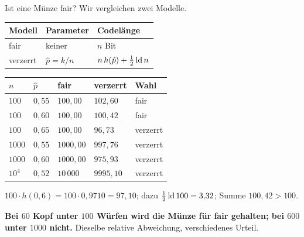 \begin{merksatz}
Ist eine Münze fair? Wir vergleichen zwei Modelle.

\begin{center}
{\small
\renewcommand{\arraystretch}{1.5}
\begin{tabular}{@{}P{2.2cm}P{2.4cm}P{3.4cm}@{}}
\toprule
\textbf{Modell} & \textbf{Parameter} & \textbf{Codelänge}\\
\midrule
fair & keiner & $n$ Bit\\
verzerrt & $\hat p = k/n$ & $n\,h(\hat p) + \tfrac12\operatorname{ld} n$\\
\bottomrule
\end{tabular}}
\end{center}

\begin{center}
{\small
\renewcommand{\arraystretch}{1.48}
\begin{tabular}{@{}P{1.4cm}P{1.4cm}P{1.8cm}P{1.8cm}P{1.8cm}@{}}
\toprule
$n$ & $\hat p$ & \textbf{fair} & \textbf{verzerrt} & \textbf{Wahl}\\
\midrule
$100$ & $0{,}55$ & $100{,}00$ & $102{,}60$ & fair\\
$100$ & $0{,}60$ & $100{,}00$ & $100{,}42$ & \textcolor{mittel}{fair}\\
$100$ & $0{,}65$ & $100{,}00$ & $96{,}73$ & verzerrt\\
$1000$ & $0{,}55$ & $1000{,}00$ & $997{,}76$ & verzerrt\\
$1000$ & $0{,}60$ & $1000{,}00$ & $975{,}93$ & verzerrt\\
$10^{4}$ & $0{,}52$ & $10\,000$ & $9995{,}10$ & verzerrt\\
\bottomrule
\end{tabular}}
\end{center}

 $100\cdot h(0{,}6) = 100\cdot0{,}9710 = 97{,}10$; dazu $\frac12\operatorname{ld}100 = 3{,}32$; Summe $100{,}42 > 100$.

\begin{center}
\begin{minipage}{0.9\textwidth}
\textbf{Bei $60$ Kopf unter $100$ Würfen wird die Münze für fair gehalten; bei $600$ unter $1000$ nicht.} Dieselbe relative Abweichung, verschiedenes Urteil.
\end{minipage}
\end{center}

\begin{center}
\begin{minipage}{0.88\textwidth}
\end{minipage}
\end{center}


\end{merksatz}
